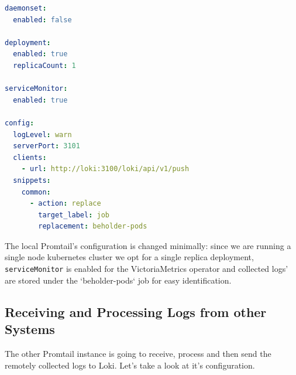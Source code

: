\begin{lstlisting}[language=yaml,caption=local-promtail-values.yml]
daemonset:
  enabled: false

deployment:
  enabled: true
  replicaCount: 1

serviceMonitor:
  enabled: true

config:
  logLevel: warn
  serverPort: 3101
  clients:
    - url: http://loki:3100/loki/api/v1/push
  snippets:
    common:
      - action: replace
        target_label: job
        replacement: beholder-pods
\end{lstlisting}

The local Promtail's configuration is changed minimally: since we are running a
single node kubernetes cluster we opt for a single replica deployment,
\verb+serviceMonitor+ is enabled for the VictoriaMetrics operator and collected
logs' are stored under the `beholder-pods` job for easy identification.

\subsection{Receiving and Processing Logs from other Systems}

The other Promtail instance is going to receive, process and then send the
remotely collected logs to Loki. Let's take a look at it's configuration.

